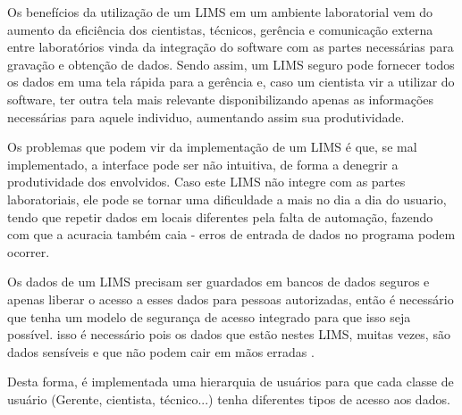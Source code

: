 

Os benefícios da utilização de um LIMS em um ambiente laboratorial vem do aumento da eficiência dos cientistas, técnicos, gerência e comunicação externa entre laboratórios vinda da integração do software com as partes necessárias para gravação e obtenção de dados. Sendo assim, um LIMS seguro pode fornecer todos os dados em uma tela rápida para a gerência e, caso um cientista vir a utilizar do software, ter outra tela mais relevante disponibilizando apenas as informações necessárias para aquele individuo, aumentando assim sua produtividade.


Os problemas que podem vir da implementação de um LIMS é que, se mal implementado, a interface pode ser não intuitiva, de forma a denegrir a produtividade dos envolvidos. Caso este LIMS não integre com as partes laboratoriais, ele pode se tornar uma dificuldade a mais no dia a dia do usuario, tendo que repetir dados em locais diferentes pela falta de automação, fazendo com que a acuracia também caia - erros de entrada de dados no programa podem ocorrer.



Os dados de um LIMS precisam ser guardados em bancos de dados seguros e apenas liberar o acesso a esses dados para pessoas autorizadas, então é necessário que tenha um modelo de segurança de acesso integrado para que isso seja possível. isso é necessário \NO pois os dados que estão nestes LIMS, muitas vezes, são dados sensíveis e que não podem cair em mãos erradas \R \NO.


Desta forma, é implementada uma hierarquia de usuários para que cada classe de usuário (Gerente, cientista, técnico...) tenha diferentes tipos de acesso aos dados.








